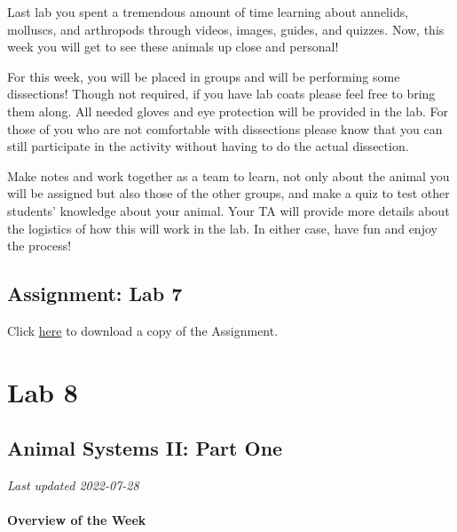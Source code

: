\documentclass[
]{book}
\begin{document}
Last lab you spent a tremendous amount of time learning about annelids, molluscs, and arthropods through videos, images, guides, and quizzes. Now, this week you will get to see these animals up close and personal!

For this week, you will be placed in groups and will be performing some dissections! Though not required, if you have lab coats please feel free to bring them along. All needed gloves and eye protection will be provided in the lab. For those of you who are not comfortable with dissections please know that you can still participate in the activity without having to do the actual dissection.

Make notes and work together as a team to learn, not only about the animal you will be assigned but also those of the other groups, and make a quiz to test other students' knowledge about your animal. Your TA will provide more details about the logistics of how this will work in the lab. In either case, have fun and enjoy the process!

\hypertarget{assignment-lab-7}{%
\chapter*{Assignment: Lab 7}\label{assignment-lab-7}}

Click \href{files/Lab7_Assignment.pdf}{here} to download a copy of the Assignment.

\hypertarget{part-lab-8}{%
\part*{Lab 8}\label{part-lab-8}}

\hypertarget{animal-systems-ii-part-one}{%
\chapter*{Animal Systems II: Part One}\label{animal-systems-ii-part-one}}

\emph{Last updated 2022-07-28}

\hypertarget{overview-of-the-week-2}{%
\subsection*{Overview of the Week}\label{overview-of-the-week-2}}
\end{document}
